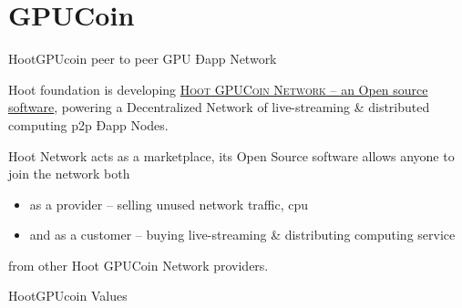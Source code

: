 \documentclass[10pt,handout]{beamer}
\begin{document}
\section{GPUCoin}
\begin{frame}[fragile]{HootGPUcoin peer to peer GPU Ðapp Network }

 Hoot foundation is developing \href{https://onhoot.com/tokensale}{\textsc{Hoot GPUCoin Network} – an Open source software}, powering a Decentralized Network of live-streaming \& distributed computing p2p Ðapp Nodes.
 

Hoot Network acts as a marketplace, its Open Source software allows anyone to join the network both 

\begin{itemize}
\item as a provider – selling unused network traffic, cpu
\item and as a customer – buying live-streaming \& distributing computing service
\end{itemize}
 from other Hoot GPUCoin Network providers. 
\end{frame}

\begin{frame}[t]{HootGPUcoin Values}


\end{frame}
\end{document}
